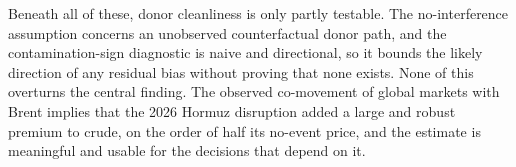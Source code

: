 Beneath all of these, donor cleanliness is only partly testable. The no-interference
assumption concerns an unobserved counterfactual donor path, and the contamination-sign
diagnostic is naive and directional, so it bounds the likely direction of any residual bias
without proving that none exists. None of this overturns the central finding. The observed
co-movement of global markets with Brent implies that the 2026 Hormuz disruption added a large
and robust premium to crude, on the order of half its no-event price, and the estimate is
meaningful and usable for the decisions that depend on it.


